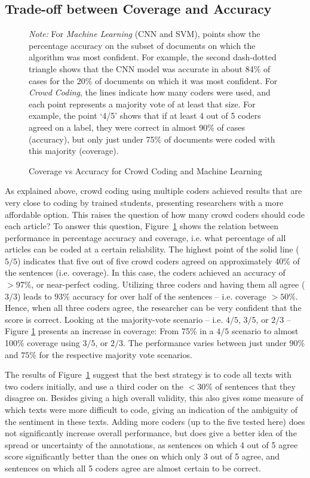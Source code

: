 \subsection{Trade-off between Coverage and Accuracy}
\begin{figure}[ht!]
\caption{Coverage vs Accuracy for Crowd Coding and Machine Learning}\label{fig:crowd}

{\small \textit{Note:} For \emph{Machine Learning} (CNN and SVM), points show the percentage accuracy on the subset of documents on which the algorithm was most confident. 
For example, the second dash-dotted triangle shows that the CNN model was accurate in about 84\% of cases for the 20\% of documents on which it was most confident.
For \emph{Crowd Coding}, the lines indicate how many coders were used, and each point represents a majority vote of at least that size. 
For example, the point `4/5' shows that if at least 4 out of 5 coders agreed on a label, they were correct in almost 90\% of cases (accuracy), 
but only just under 75\% of documents were coded with this majority (coverage).}
\end{figure}

\noindent As explained above, crowd coding using multiple coders achieved results that are very close to coding by trained students,
presenting researchers with a more affordable option. 
This raises the question of how many crowd coders should code each article?
To answer this question, Figure~\ref{fig:crowd} shows the relation between performance in percentage accuracy and coverage, i.e. what percentage of all articles can be coded at a certain reliability. 
The highest point of the solid line ($5/5$) indicates that five out of five crowd coders agreed on approximately 40\% of the sentences (i.e. coverage).
In this case, the coders achieved an accuracy of $>97\%$, or near-perfect coding. 
Utilizing three coders and having them all agree ($3/3$) leads to $93\%$ accuracy for over half of the sentences -- i.e. coverage $>50\%$. 
Hence, when all three coders agree, the researcher can be very confident that the score is correct. 
Looking at the majority-vote scenario -- i.e. $4/5$, $3/5$, or $2/3$ -- Figure \ref{fig:crowd} presents an increase in coverage: From 75\% in a $4/5$ scenario to almost 100\% coverage using $3/5$, or $2/3$.
The performance varies between just under $90\%$ and $75\%$ for the respective majority vote scenarios. 

The results of Figure~\ref{fig:crowd} suggest that the best strategy is to code all texts with two coders initially, and use a third coder on the $<30\%$ of sentences that they disagree on. 
Besides giving a high overall validity, this also gives some measure of which texts were more difficult to code, 
giving an indication of the ambiguity of the sentiment in these texts. 
Adding more coders (up to the five tested here) does not significantly increase overall performance, but does give a better idea of the spread or uncertainty of the annotations, as sentences on which 4 out of 5 agree score significantly better than the ones on which only 3 out of 5 agree, and sentences on which all 5 coders agree are almost certain to be correct. 

